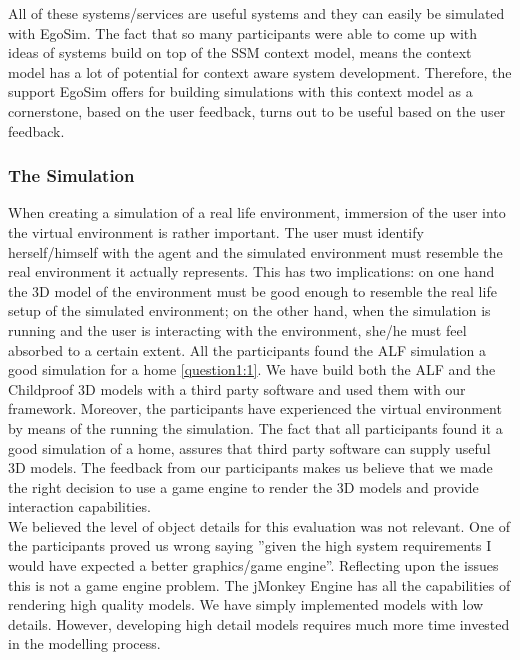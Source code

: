 All of these systems/services are useful systems and they can easily be simulated with EgoSim. The fact that so many participants were able to come up with ideas of systems build on top of the SSM context model, means the context model has a lot of potential for context aware system development. Therefore, the support EgoSim offers for building simulations with this context model as a cornerstone, based on the user feedback, turns out to be useful based on the user feedback.

\subsubsection{The Simulation} %
When creating a simulation of a real life environment, immersion of the user into the virtual environment is rather important. The user must identify herself/himself with the agent and the simulated environment must resemble the real environment it actually represents. This has two implications: on one hand the 3D model of the environment must be good enough to resemble the real life setup of the simulated environment; on the other hand, when the simulation is running and the user is interacting with the environment, she/he must feel absorbed to a certain extent. All the participants found the ALF simulation a good simulation for a home \ref{question1:1}. We have build both the ALF and the Childproof 3D models with a third party software and used them with our framework. Moreover, the participants have experienced the virtual environment by means of the running the simulation. The fact that all participants found it a good simulation of a home, assures that third party software can supply useful 3D models. The feedback from our participants makes us believe that we made the right decision to use a game engine to render the 3D models and provide interaction capabilities.\\

We believed the level of object details for this evaluation was not relevant. One of the participants proved us wrong saying ''given the high system requirements I would have expected a better graphics/game engine''. Reflecting upon the issues this is not a game engine problem. The jMonkey Engine has all the capabilities of rendering high quality models. We have simply implemented models with low details. However, developing high detail models requires much more time invested in the modelling process.\\

